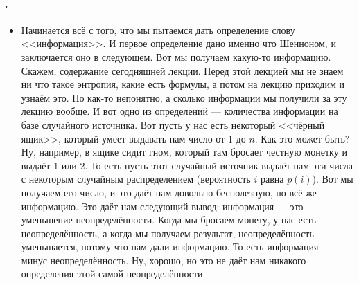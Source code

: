 \documentclass{article}
\begin{document}
    \paragraph{.}
    \begin{itemize}
        \item[]
        \begin{Comment}
            Начинается всё с того, что мы пытаемся дать определение слову <<информация>>. И первое определение дано именно что Шенноном, и заключается оно в следующем. Вот мы получаем какую-то информацию. Скажем, содержание сегодняшней лекции. Перед этой лекцией мы не знаем ни что такое энтропия, какие есть формулы, а потом на лекцию приходим и узнаём это. Но как-то непонятно, а сколько информации мы получили за эту лекцию вообще. И вот одно из определений --- количества информации на базе случайного источника. Вот пусть у нас есть некоторый <<чёрный ящик>>, который умеет выдавать нам число от 1 до $n$. Как это может быть? Ну, например, в ящике сидит гном, который там бросает честную монетку и выдаёт 1 или 2. То есть пусть этот случайный источник выдаёт нам эти числа с некоторым случайным распределением (вероятность $i$ равна $p(i)$). Вот мы получаем его число, и это даёт нам довольно бесполезную, но всё же информацию. Это даёт нам следующий вывод: информация --- это уменьшение неопределённости. Когда мы бросаем монету, у нас есть неопределённость, а когда мы получаем результат, неопределённость уменьшается, потому что нам дали информацию. То есть информация --- минус неопределённость. Ну, хорошо, но это не даёт нам никакого определения этой самой неопределённости.\\

\end{Comment}
\end{itemize}
\end{document}
